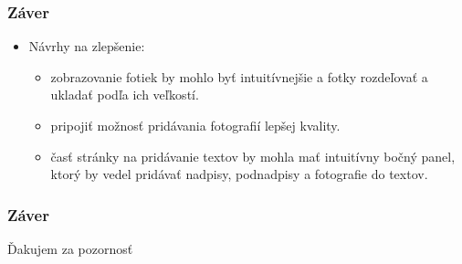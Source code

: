 \begin{frame}\frametitle{Záver}
 \begin{itemize}
 \item Návrhy na zlepšenie:
           \begin{itemize}
          \item zobrazovanie fotiek by mohlo byť intuitívnejšie a fotky rozdeľovať a ukladať podľa ich veľkostí.
          \item pripojiť možnosť pridávania fotografií lepšej kvality.
          \item časť stránky na pridávanie textov by mohla mať intuitívny bočný panel, ktorý by vedel pridávať nadpisy, podnadpisy a fotografie do textov.
         \end{itemize}
 \end{itemize}

\end{frame}

\begin{frame}\frametitle{Záver}

\center Ďakujem za pozornosť



\end{frame}